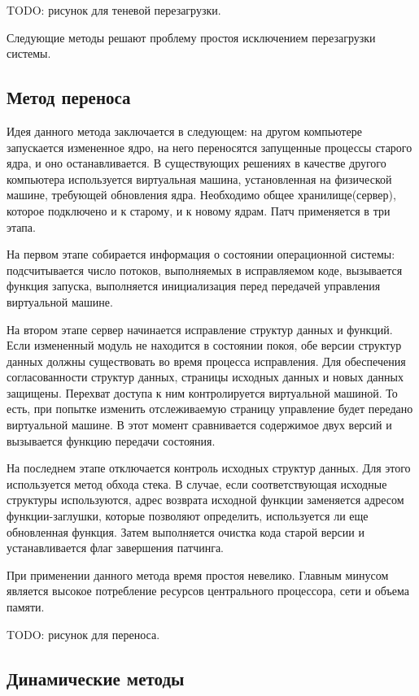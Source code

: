 TODO: рисунок для теневой перезагрузки.

Следующие методы решают проблему простоя исключением перезагрузки системы.

\subsection{Метод переноса}

Идея данного метода \cite{dynamic} заключается в следующем: на другом компьютере запускается измененное ядро, на него переносятся запущенные процессы старого ядра, и оно останавливается. В существующих решениях в качестве другого компьютера используется виртуальная машина, установленная на физической машине, требующей обновления ядра. Необходимо общее хранилище(сервер), которое подключено и к старому, и к новому ядрам. Патч применяется в три этапа.

На первом этапе собирается информация о состоянии операционной системы: подсчитывается число потоков, выполняемых в исправляемом коде, вызывается функция запуска, выполняется инициализация перед передачей управления виртуальной машине.

На втором этапе сервер начинается исправление структур данных и функций. Если измененный модуль не находится в состоянии покоя, обе версии структур данных должны существовать во время процесса исправления. Для обеспечения согласованности структур данных, страницы исходных данных и новых данных защищены. Перехват доступа к ним контролируется виртуальной машиной. То есть, при попытке изменить отслеживаемую страницу управление будет передано виртуальной машине. В этот момент сравнивается содержимое двух версий и вызывается функцию передачи состояния.

На последнем этапе отключается контроль исходных структур данных. Для этого используется метод обхода стека. В случае, если соответствующая исходные структуры используются, адрес возврата исходной функции заменяется адресом функции-заглушки, которые позволяют определить, используется ли еще обновленная функция. Затем выполняется очистка кода старой версии и устанавливается флаг завершения патчинга.

При применении данного метода время простоя невелико. Главным минусом является высокое потребление ресурсов центрального процессора, сети и объема памяти.

TODO: рисунок для переноса.

\subsection{Динамические методы}

